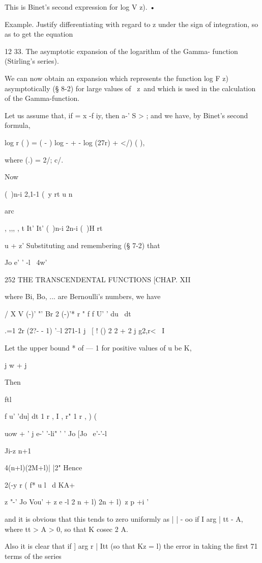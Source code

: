 This is Binet's second expression for log V z). •

Example. Justify differentiating with regard to z under the sign of
integration, so as to get the equation

12 33. The asymptotic expansion of the logarithm of the Gamma-
function (Stirling's series).

We can now obtain an expansion which represents the function log F z)
asymptotically (§ 8-2) for large values of \ z\, and which is used in
the calculation of the Gamma-function.

Let us assume that, if = x -f iy, then a-' S > ; and we have, by
Binet's second formula,

log r ( ) = ( - ) log - + - log (27r) + </) ( ),

where (.) = 2/; c/.

Now

(\ )n-i 2,1-1 (\ y rt u n

arc

, ,,, , t It' It' (\ )n-i 2n-i (\ )H rt

u + z' Substituting and remembering (§ 7-2) that

Jo e' ' -l ~4w'

252 THE TRANSCENDENTAL FUNCTIONS [CHAP. XII

where Bi, Bo, ... are Bernoulli's numbers, we have

  / X V (-)' "' Br 2 (-)'* r " f f U' ' du \ dt

.=1 2r (2?- - 1) '--l 271-1 j \ [ ! () 2 2 + 2 j g2,r< \ I

Let the upper bound * of — 1 for positive values of u be K,

j w + j

Then

ftl

f u' 'du] dt 1 r , I , r" 1 r , ) (

uow + ' j e-' '-li" ' ' Jo [Jo \ e'-'-l

Ji-z n+1

 4(n+l)(2M+l)| |2" Hence

2(-y r ( f* u l \ d KA+

z "-' Jo Vou' + z e -l 2 n + l) 2n + l)\ z p +i '

and it is obvious that this tends to zero uniformly as | | - oo if I
arg | tt - A, where tt > A > 0, so that K cosec 2 A.

Also it is clear that if ] arg r | Itt (so that Kz = l) the error in
taking the first 71 terms of the series

